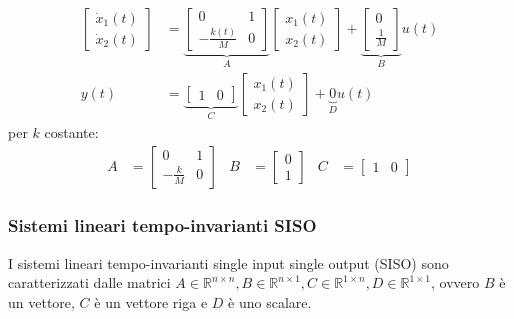 \documentclass{article}
\numberwithin{equation}{subsection}
\begin{document}
\begin{align*}
    \begin{bmatrix}
        \dot x_1(t)\\
        \dot x_2(t)
    \end{bmatrix}
    &=
    \underbrace{\begin{bmatrix}
        0 & 1\\
        -\frac{k(t)}{M} & 0
    \end{bmatrix}}_{A}
    \begin{bmatrix}
        x_1(t)\\
        x_2(t)
    \end{bmatrix}
    +
    \underbrace{\begin{bmatrix}
        0\\
        \frac{1}{M}
    \end{bmatrix}}_{B}
    u(t)
    \\
    y(t) &= 
    \underbrace{\begin{bmatrix}
        1 & 0
    \end{bmatrix}}_{C}
    \begin{bmatrix}
        x_1(t)\\
        x_2(t)
    \end{bmatrix}
    + \underbrace{0}_D u(t)
\end{align*}
per $k$ costante:
\begin{align*}
    A &= \begin{bmatrix}
        0 & 1\\
        - \frac{k}{M} & 0
    \end{bmatrix}
    &
    B &= 
    \begin{bmatrix}
        0\\
        1
    \end{bmatrix}
    &
    C &= 
    \begin{bmatrix}
        1 & 0
    \end{bmatrix}
\end{align*}


\subsubsection{Sistemi lineari tempo-invarianti SISO}
I sistemi lineari tempo-invarianti single input single output (SISO) sono caratterizzati dalle matrici $A \in \mathbb{R}^{n \times n} , B \in \mathbb{R}^{n \times 1}, C \in \mathbb{R}^{1 \times n} , D \in \mathbb{R}^{1 \times 1}$, ovvero $B$ è un vettore, $C$ è un vettore riga e $D$ è uno scalare.
\end{document}
